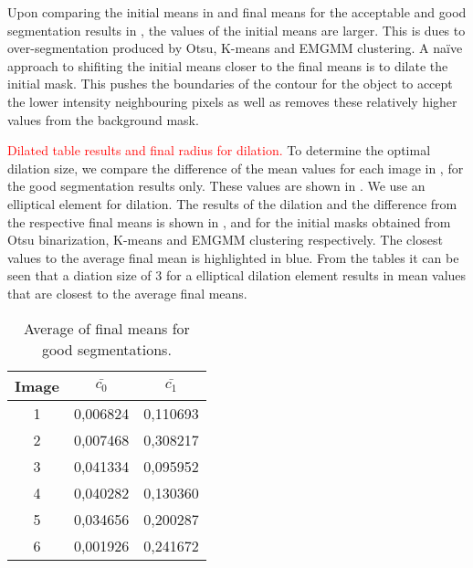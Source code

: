Upon comparing the initial means in  and final means for the acceptable and good segmentation results in , the values of the initial means are larger. This is dues to over-segmentation produced by Otsu, K-means and EMGMM clustering. A na{\"i}ve approach to shifiting the initial means closer to the final means is to dilate the initial mask. This pushes the boundaries of the contour for the object to accept the lower intensity neighbouring pixels as well as removes these relatively higher values from the background mask.

\textcolor{red}{Dilated table results and final radius for dilation.}
To determine the optimal dilation size, we compare the difference of the mean values for each image in , for the good segmentation results only. These values are shown in . We use an elliptical element for dilation. The results of the dilation and the difference from the respective final means is shown in ,  and  for the initial masks obtained from Otsu binarization, K-means and EMGMM clustering respectively. The closest values to the average final mean is highlighted in blue. From the tables it can be seen that a diation size of 3 for a elliptical dilation element results in mean values that are closest to the average final means.

\begin{table}
	\centering
	\caption{Average of final means for good segmentations.}
	\begin{tabular}{|c|c|c|}
		\hline 
		Image & $\bar{c_0}$ & $\bar{c_1}$ \\ 
		\hline 
		1 & 0,006824 & 0,110693 \\ 
		\hline 
		2 & 0,007468 & 0,308217 \\ 
		\hline 
		3 & 0,041334 & 0,095952 \\ 
		\hline 
		4 & 0,040282 & 0,130360 \\ 
		\hline 
		5 & 0,034656 & 0,200287 \\ 
		\hline 
		6 & 0,001926 & 0,241672 \\ 
		\hline 
	\end{tabular}
	\label{tab:meanofmeans}
\end{table}


